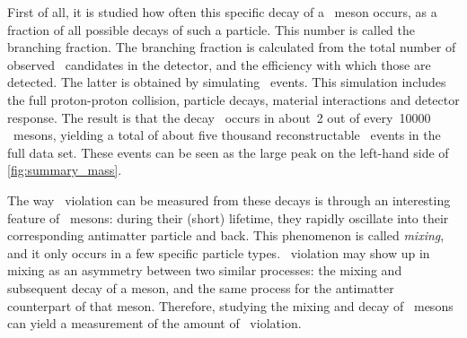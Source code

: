 First of all, it is studied how often this specific decay of a \Bs~meson occurs, as a fraction of all possible decays of such a particle.
This number is called the branching fraction.
The branching fraction is calculated from the total number of observed \BsDsK~candidates in the detector, and the efficiency with which those are detected.
The latter is obtained by simulating \BsDsK~events.
This simulation includes the full proton-proton collision, particle decays, material interactions and detector response.
The result is that the decay \BsDsK~occurs in about~\num{2} out of every~\num{10000} \Bs~mesons, yielding a total of about five thousand reconstructable \BsDsK~events in the full data set.
These events can be seen as the large peak on the left-hand side of \cref{fig:summary_mass}.

The way \CP~violation can be measured from these decays is through an interesting feature of \Bs~mesons: during their (short) lifetime, they rapidly oscillate into their corresponding antimatter particle and back.
This phenomenon is called \emph{mixing}, and it only occurs in a few specific particle types.
\CP~violation may show up in mixing as an asymmetry between two similar processes: the mixing and subsequent decay of a meson, and the same process for the antimatter counterpart of that meson.
Therefore, studying the mixing and decay of \Bs~mesons can yield a measurement of the amount of \CP~violation.

